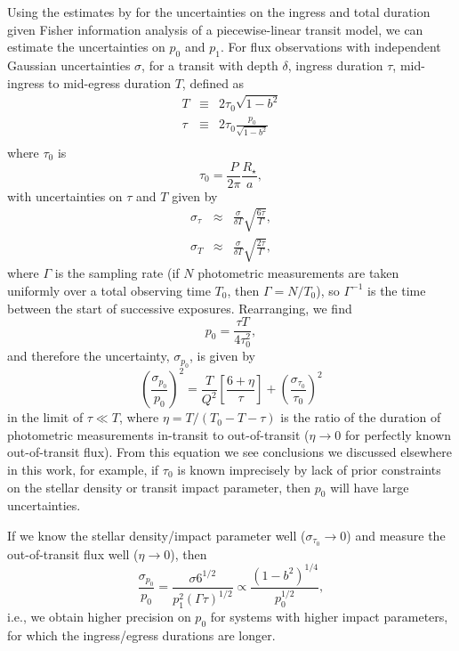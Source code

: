 \begin{subappendices}
Using the estimates by \citet{Carter2008} for the uncertainties on the ingress and total duration given Fisher information analysis of a piecewise-linear transit model, we can estimate the uncertainties on $p_0$ and $p_1$. For flux observations with independent Gaussian uncertainties $\sigma$, for a transit with depth $\delta$, ingress duration $\tau$, mid-ingress to mid-egress duration $T$, defined as 
\begin{eqnarray}
T &\equiv& 2 \tau_0 \sqrt{1-b^2} \\ 
\tau &\equiv& 2 \tau_0 \frac{p_0}{\sqrt{1-b^2}} \\ 
\end{eqnarray}
where $\tau_0$ is
\begin{equation}
\tau_0 = \frac{P}{2\pi}\frac{R_\star}{a},
\end{equation}
with uncertainties on $\tau$ and $T$ given by
\begin{eqnarray}
\sigma_\tau &\approx& \frac{\sigma}{\delta T} \sqrt{\frac{6 \tau}{\Gamma}} ,\\
\sigma_T &\approx& \frac{\sigma}{\delta T} \sqrt{\frac{2 \tau}{\Gamma}},
\end{eqnarray}
where $\Gamma$ is the sampling rate (if $N$ photometric measurements are
taken uniformly over a total observing time $T_0$, then $\Gamma = N/T_0$),
so $\Gamma^{-1}$ is the time between the start of successive exposures.
Rearranging, we find
\begin{equation}
p_0 = \frac{\tau T}{4\tau_0^2}, 
\end{equation}
and therefore the uncertainty, $\sigma_{p_0}$, is given by 
\begin{equation}
\left(\frac{\sigma_{p_0}}{p_0}\right)^2 = \frac{T}{Q^2} \left[\frac{6+\eta}{\tau} \right]+\left(\frac{\sigma_{\tau_0}}{\tau_0}\right)^2
\end{equation}
in the limit of $\tau \ll T$, where $\eta = T/(T_0-T-\tau)$ is the ratio of the duration of photometric measurements in-transit to out-of-transit ($\eta \rightarrow 0$ for perfectly known out-of-transit flux). From this equation we see conclusions we discussed elsewhere in this work, for example, if $\tau_0$ is known imprecisely by lack of prior constraints on the stellar density or transit impact parameter, then $p_0$ will have large uncertainties. 

If we know the stellar density/impact parameter well ($\sigma_{\tau_0}\rightarrow 0$) and measure the out-of-transit flux well ($\eta \rightarrow 0$), then 
\begin{equation} \label{error_p0}
\frac{\sigma_{p_0}}{p_0} = \frac{\sigma 6^{1/2}}{p_1^2(\Gamma \tau)^{1/2}} \propto \frac{(1-b^2)^{1/4}}{p_0^{1/2}},
\end{equation}
i.e., we obtain higher precision on $p_0$ for systems with higher impact parameters, for which the ingress/egress durations are longer. 


\end{subappendices}
